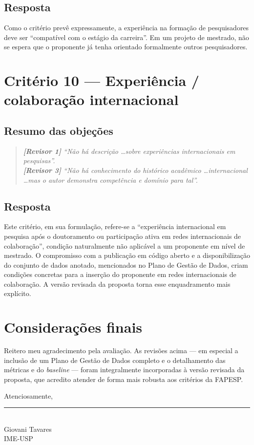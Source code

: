 \documentclass{article}
\newenvironment{parecer}
{\begin{quote}\itshape\color{gray!70!black}\small}
	{\end{quote}}
\newcommand{\revisor}[1]{\textbf{[Revisor #1]}}
\begin{document}
	\subsection{Resposta}
	
	Como o critério prevê expressamente, a experiência na formação de pesquisadores
	deve ser ``compatível com o estágio da carreira''. Em um projeto de mestrado, não
	se espera que o proponente já tenha orientado formalmente outros pesquisadores.
	
	\section{Critério 10 --- Experiência / colaboração internacional}
	
	\subsection{Resumo das objeções}
	\begin{parecer}
		\revisor{1} ``Não há descrição \ldots sobre experiências internacionais em
		pesquisas''.\\
		\revisor{3} ``Não há conhecimento do histórico acadêmico \ldots internacional
		\ldots mas o autor demonstra competência e domínio para tal''.
	\end{parecer}
	
	\subsection{Resposta}
	
	Este critério, em sua formulação, refere-se a ``experiência internacional em
	pesquisa após o doutoramento ou participação ativa em redes internacionais de
	colaboração'', condição naturalmente não aplicável a um proponente em nível de
	mestrado. O compromisso	com a publicação em código aberto e a disponibilização do conjunto de dados
	anotado, mencionados no Plano de Gestão de Dados, criam condições concretas para
	a inserção do proponente em redes internacionais de colaboração. A versão revisada
	da proposta torna esse enquadramento mais explícito.
	
	\section{Considerações finais}
	
	Reitero meu agradecimento pela avaliação. As revisões acima --- em especial a
	inclusão de um Plano de Gestão de Dados completo e o detalhamento das métricas e
	do \textit{baseline} --- foram integralmente incorporadas à versão revisada da
	proposta, que acredito atender de forma mais robusta aos critérios da FAPESP.
	
	\vspace{1.5em}
	\noindent Atenciosamente,\\[2em]
	\noindent\rule{6cm}{0.4pt}\\
	Giovani Tavares\\
	IME-USP
	
\end{document}
